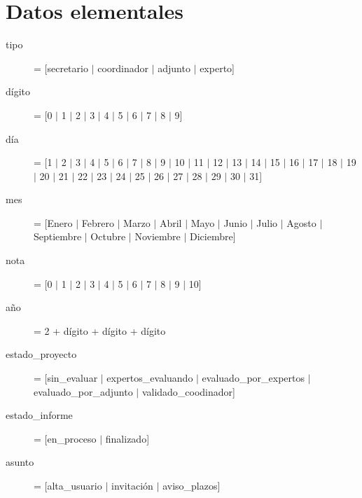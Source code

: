 \documentclass[12pt,a4paper,spanish,twoside]{book}
\begin{document}
\section{Datos elementales}
\begin{description}
\item[tipo] = [secretario $\mid$ coordinador $\mid$ adjunto $\mid$ experto]

\item[dígito] = [0 $\mid$ 1 $\mid$ 2 $\mid$ 3 $\mid$ 4 $\mid$ 5 $\mid$ 6
  $\mid$ 7 $\mid$ 8 $\mid$ 9] 

\item[día] = [1 $\mid$ 2 $\mid$ 3 $\mid$ 4 $\mid$ 5 $\mid$ 6 $\mid$ 7 $\mid$
  8 $\mid$ 9 $\mid$ 10 $\mid$ 11 $\mid$ 12 $\mid$ 13 $\mid$ 14 $\mid$ 15
  $\mid$ 16 $\mid$ 17 $\mid$ 18 $\mid$ 19 $\mid$ 20 $\mid$ 21 $\mid$ 22
  $\mid$ 23 $\mid$ 24 $\mid$ 25 $\mid$ 26 $\mid$ 27 $\mid$ 28 $\mid$ 29
  $\mid$ 30 $\mid$ 31] 

\item[mes] = [Enero $\mid$ Febrero $\mid$ Marzo $\mid$ Abril $\mid$ Mayo
  $\mid$ Junio $\mid$ Julio $\mid$ Agosto $\mid$ Septiembre $\mid$ Octubre
  $\mid$ Noviembre $\mid$ Diciembre] 

\item[nota] = [0 $\mid$ 1 $\mid$ 2 $\mid$ 3 $\mid$ 4 $\mid$ 5 $\mid$ 6 $\mid$
  7 $\mid$ 8 $\mid$ 9 $\mid$ 10] 

\item[año] = 2 + dígito + dígito + dígito

\item[estado\_proyecto] = [sin\_evaluar $\mid$ expertos\_evaluando $\mid$
  evaluado\_por\_expertos $\mid$ evaluado\_por\_adjunto $\mid$
  validado\_coodinador] 

\item[estado\_informe] = [en\_proceso $\mid$ finalizado]

\item[asunto] = [alta\_usuario $\mid$ invitación $\mid$ aviso\_plazos]
\end{description}
\end{document}
